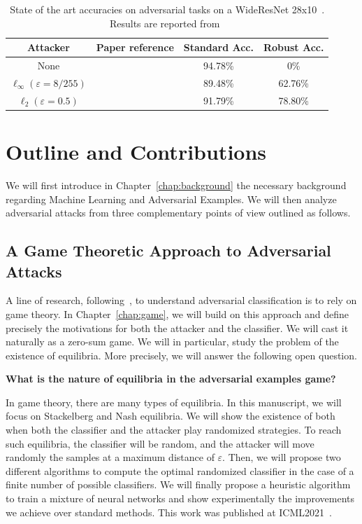 \begin{table}[ht]
    \centering
    \begin{tabular}{c|c|c|c}
       \textbf{Attacker}  &  \textbf{Paper reference} & \textbf{Standard Acc.} & \textbf{Robust Acc.}  \\ \hline
        None & \citep{ZagoruykoK16} & 94.78\% & 0\%\\
        $\ell_\infty (\varepsilon=8/255)$&  \citep{rebuffi2021fixing}& 89.48\% & 62.76\%\\
        $\ell_2 (\varepsilon=0.5)$&  \citep{rebuffi2021fixing}& 91.79\% & 78.80\%\\
    \end{tabular}
    \caption{State of the art accuracies on adversarial tasks on a WideResNet 28x10~\citep{ZagoruykoK16}. Results are reported from~\citep{croce2020robustbench}}
\label{table:sota-cifar}
\end{table}

\section{Outline and Contributions}
We will first introduce in Chapter~\ref{chap:background} the necessary  background regarding Machine Learning and Adversarial Examples. We will then analyze  adversarial attacks from three complementary points of view outlined as follows.
\subsection{A Game Theoretic Approach to Adversarial Attacks}

A line of research, following~\cite{pinot2020randomization}, to understand adversarial classification is to rely on game theory. In Chapter~\ref{chap:game},  we will build on this approach and define precisely the motivations for both the attacker and the classifier. We will cast it naturally as a zero-sum game. We will in particular, study the problem  of the existence of equilibria. More precisely, we will answer the following open question.
\medskip
\begin{tcolorbox}[colback=grund,colframe=rahmen,title=Question 1]
\textbf{What is the nature of equilibria in the adversarial examples game?}
\end{tcolorbox}
\medskip

In game theory, there are many types of equilibria. In this manuscript, we will focus on Stackelberg and Nash equilibria. We will show the existence of both when both the classifier and the attacker play randomized strategies. To reach such equilibria, the classifier will be random, and the attacker will move randomly the samples at a maximum distance of $\varepsilon$. Then, we will propose two different algorithms to compute the optimal randomized classifier in the case of a finite number of possible classifiers. We will finally propose a heuristic algorithm to train a mixture of neural networks and show experimentally the improvements we achieve over standard methods. This work was published at ICML2021~\citep{pmlr-v139-meunier21a}.




